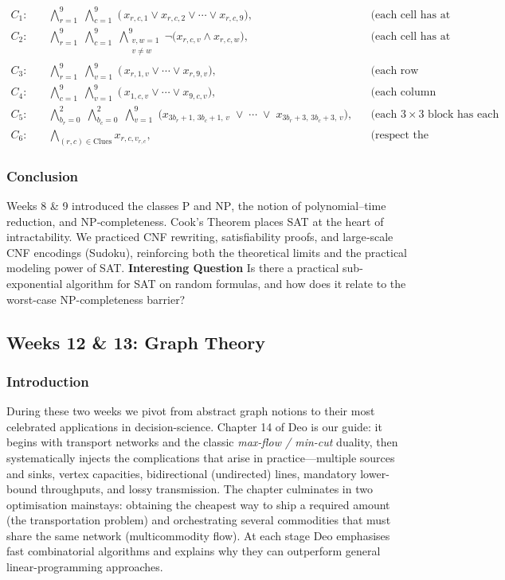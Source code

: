 \documentclass{article}
\theoremstyle{theorem}
\theoremstyle{definition}
\theoremstyle{remark}
\begin{document}
\[
\begin{aligned}
C_1{:}&\quad
\bigwedge_{r=1}^9\;\bigwedge_{c=1}^9\;\bigl(\,x_{r,c,1}\lor x_{r,c,2}\lor\cdots\lor x_{r,c,9}\bigr),
&&\text{(each cell has at least one value)}\\
C_2{:}&\quad
\bigwedge_{r=1}^9\;\bigwedge_{c=1}^9\;\bigwedge_{\substack{v,w=1\\v\neq w}}^9
\neg\bigl(x_{r,c,v}\land x_{r,c,w}\bigr),
&&\text{(each cell has at most one value)}\\
C_3{:}&\quad
\bigwedge_{r=1}^9\;\bigwedge_{v=1}^9\;\bigl(\,x_{r,1,v}\lor\cdots\lor x_{r,9,v}\bigr),
&&\text{(each row contains each value)}\\
C_4{:}&\quad
\bigwedge_{c=1}^9\;\bigwedge_{v=1}^9\;\bigl(\,x_{1,c,v}\lor\cdots\lor x_{9,c,v}\bigr),
&&\text{(each column contains each value)}\\
C_5{:}&\quad
\bigwedge_{b_r=0}^2\;\bigwedge_{b_c=0}^2\;\bigwedge_{v=1}^9
\;\bigl(x_{3b_r+1,\,3b_c+1,\,v}\;\lor\;\cdots\;\lor\;x_{3b_r+3,\,3b_c+3,\,v}\bigr),
&&\text{(each \(3\times3\) block has each value)}\\
C_6{:}&\quad
\bigwedge_{(r,c)\in\mathrm{Clues}}x_{r,c,v_{r,c}},
&&\text{(respect the given clues).}
\end{aligned}
\]

\subsubsection{Conclusion}
Weeks 8 \& 9 introduced the classes \(\mathrm{P}\) and \(\mathrm{NP}\), the
notion of polynomial–time reduction, and NP‐completeness.  Cook’s Theorem
places SAT at the heart of intractability.  We practiced CNF rewriting,
satisfiability proofs, and large‐scale CNF encodings (Sudoku), reinforcing
both the theoretical limits and the practical modeling power of SAT.
\textbf{Interesting Question}
Is there a practical sub-exponential algorithm for SAT on random formulas,
and how does it relate to the worst-case NP-completeness barrier?

\subsection{Weeks 12 \& 13: Graph Theory}

\subsubsection{Introduction}
During these two weeks we pivot from abstract graph notions to their most celebrated applications in decision-science.  Chapter 14 of Deo is our guide: it begins with transport networks and the classic \emph{max-flow / min-cut} duality, then systematically injects the complications that arise in practice—multiple sources and sinks, vertex capacities, bidirectional (undirected) lines, mandatory lower-bound throughputs, and lossy transmission.  The chapter culminates in two optimisation mainstays: obtaining the cheapest way to ship a required amount (the transportation problem) and orchestrating several commodities that must share the same network (multicommodity flow).  At each stage Deo emphasises fast combinatorial algorithms and explains why they can outperform general linear-programming approaches. \cite{Deo}
\end{document}
